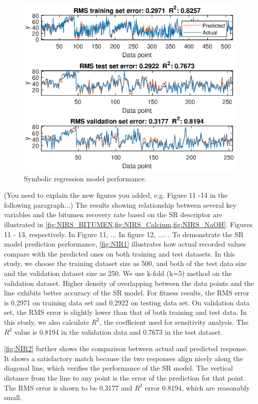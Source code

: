 \documentclass[final,5p,times,twocolumn]{elsarticle}
\begin{document}
\begin{figure}[!hptb]
	\centering
	\includegraphics[width=\linewidth,clip]{NIR6.eps}
	
	\caption{Symbolic regression model performance.}
	\label{fig:NIR1}
\end{figure}
%
{\color{red} (You need to explain the new figures you added, e.g. Figure 11 -14 in the following paragraph...)}
The results showing relationship between several key variables and the bitumen recovery rate based on the SR descriptor are illustrated in \cref{fig:NIRS_BITUMEN,fig:NIRS_Calcium,fig:NIRS_NaOH}. Figures 11 - 13, respectively. In Figure 11, ...  In figure 12, .... 
.
To demonstrate the SR model prediction performance, \autoref{fig:NIR1} illustrates how actual recorded values compare with the predicted ones on both training and test datasets. In this study, we choose the training dataset size as 500, and both of the test data size and the validation dataset size as 250. We use k-fold (k=5) method on the validation dataset. Higher density of overlapping between the data points and the line exhibits better accuracy of the SR model. For fitness results, the RMS error is 0.2971 on training data set and 0.2922 on testing data set. On validation data set, the RMS error is slightly lower than that of both training and test data. In this study, we also calculate $R^2$, the coefficient used for sensitivity analysis. The $R^2$ value is 0.8194 in the validation data and 0.7673 in the test dataset.

\autoref{fig:NIR2} further shows the comparison between actual and predicted response. It shows a satisfactory match because the two responses align nicely along the diagonal line, which verifies the performance of the SR model. The vertical distance from the line to any point is the error of the prediction for that point. The RMS error is shown to be 0.3177 and $R^2$ error 0.8194, which are reasonably small. 
\end{document}
